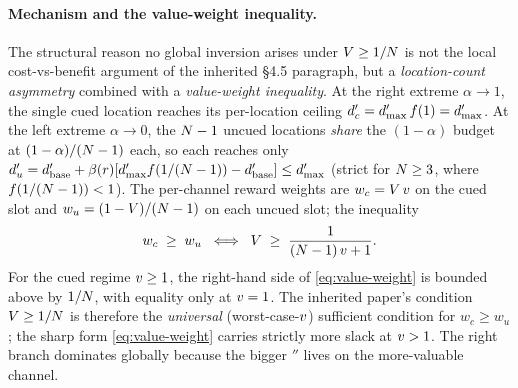 \paragraph{Mechanism and the value-weight inequality.}
The structural reason no global inversion arises under $V \ge
1/N$ is not the local cost-vs-benefit argument of the inherited
§4.5 paragraph, but a \emph{location-count asymmetry} combined with a
\emph{value-weight inequality}. At the right extreme $\alpha \to 1$,
the single cued location reaches its per-location ceiling
$d'_c = d'_{\max}\, f(1) = d'_{\max}$. At the left extreme
$\alpha \to 0$, the $N - 1$ uncued locations \emph{share} the
$(1 - \alpha)$ budget at $(1 - \alpha)/(N - 1)$ each, so each
reaches only $d'_u = d'_{\mathrm{base}} +
\beta(r)[d'_{\max} f(1/(N - 1)) - d'_{\mathrm{base}}]
\le d'_{\max}$ (strict for $N \ge 3$, where
$f(1/(N - 1)) < 1$). The per-channel reward weights are
$w_c = V \, v$ on the cued slot and
$w_u = (1 - V)/(N - 1)$ on each uncued slot; the inequality
%
\begin{equation}
  w_c \;\ge\; w_u
  \;\iff\;
  V \;\ge\; \frac{1}{(N - 1)\,v + 1}.
  \label{eq:value-weight}
\end{equation}
%
For the cued regime $v \ge 1$, the right-hand side of
\eqref{eq:value-weight} is bounded above by $1/N$, with equality
only at $v = 1$. The inherited paper's condition $V \ge
1/N$ is therefore the \emph{universal} (worst-case-$v$)
sufficient condition for $w_c \ge w_u$; the sharp form
\eqref{eq:value-weight} carries strictly more slack at $v > 1$.
The right branch dominates globally because the bigger $\dprime$
lives on the more-valuable channel.

